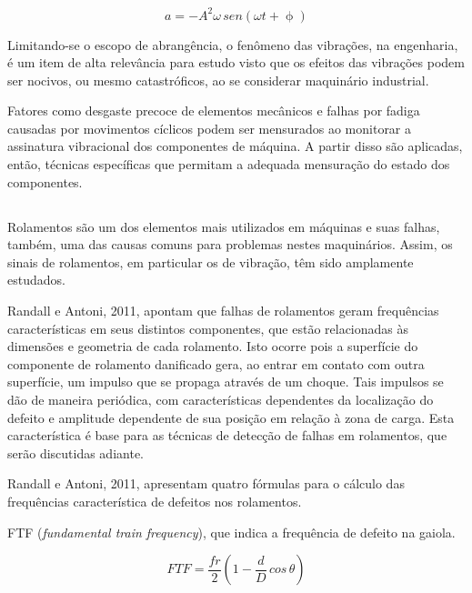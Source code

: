\documentclass[
	12pt,				
	oneside,			
	a4paper,			
	english,			
	brazil,			
	]{abntex2ppgsi}
\begin{document}
\begin{equation}
	a = -A^{2} \omega \,sen (\omega t + \upphi)
	\label{eq: Equação de Aceleração}
\end{equation}

Limitando-se o escopo de abrangência, o fenômeno das vibrações, na engenharia, é um item de alta relevância para estudo visto que os efeitos das vibrações podem ser nocivos, ou mesmo catastróficos, ao se considerar maquinário industrial. 

Fatores como desgaste precoce de elementos mecânicos e falhas por fadiga causadas por movimentos cíclicos podem ser mensurados ao monitorar a assinatura vibracional dos componentes de máquina. A partir disso são aplicadas, então, técnicas específicas que permitam a adequada mensuração do estado dos componentes. 

\subsection{}
\label{secao:frequenciasCaracteristicas}

Rolamentos são um dos elementos mais utilizados em máquinas e suas falhas, também, uma das causas comuns para problemas nestes maquinários. Assim, os sinais de rolamentos, em particular os de vibração, têm sido amplamente estudados. 

Randall e Antoni, 2011, apontam que falhas de rolamentos geram frequências características em seus distintos componentes, que estão relacionadas às dimensões e geometria de cada rolamento. Isto ocorre pois a superfície do componente de rolamento danificado gera, ao entrar em contato com outra superfície, um impulso que se propaga através de um choque. Tais impulsos se dão de maneira periódica, com características dependentes da localização do defeito e amplitude dependente de sua posição em relação à zona de carga. Esta característica é base para as técnicas de detecção de falhas em rolamentos, que serão discutidas adiante.


Randall e Antoni, 2011, apresentam quatro fórmulas para o cálculo das frequências característica de defeitos nos rolamentos.

FTF (\textit{fundamental train frequency}), que indica a frequência de defeito na gaiola.

\begin{equation}
	FTF = \frac{fr}{2} \left ( 1 - \frac{d}{D} \,cos \, \theta \right ) 
	\label{eq: FTF}
\end{equation}
\end{document}
